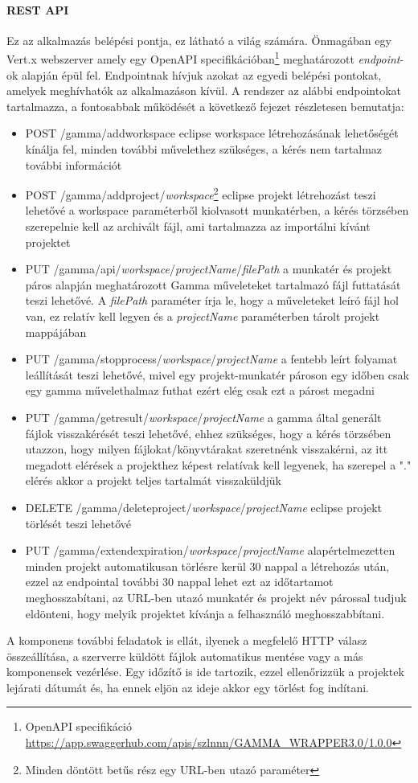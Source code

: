 \paragraph{REST API} Ez az alkalmazás belépési pontja, ez látható a világ számára. Önmagában egy Vert.x webszerver amely egy OpenAPI specifikációban\footnote{OpenAPI specifikáció \url{https://app.swaggerhub.com/apis/szlnnn/GAMMA_WRAPPER3.0/1.0.0}} meghatározott \textit{endpoint}-ok alapján épül fel. Endpointnak hívjuk azokat az egyedi belépési pontokat, amelyek meghívhatók az alkalmazáson kívül. A rendszer az alábbi endpointokat tartalmazza, a fontosabbak működését a következő fejezet részletesen bemutatja:
\begin{itemize}
	\item POST /gamma/addworkspace eclipse workspace létrehozásának lehetőségét kínálja fel, minden további művelethez szükséges, a kérés nem tartalmaz további információt
	\item POST /gamma/addproject/{\textit{workspace}}\footnote{Minden döntött betűs rész egy URL-ben utazó paraméter} eclipse projekt létrehozást teszi lehetővé a {workspace} paraméterből kiolvasott munkatérben, a kérés törzsében szerepelnie kell az archivált fájl, ami tartalmazza az importálni kívánt projektet
	\item PUT /gamma/api/{\textit{workspace}}/{\textit{projectName}}/{\textit{filePath}} a munkatér és projekt páros alapján meghatározott Gamma műveleteket tartalmazó fájl futtatását teszi lehetővé. A {\textit{filePath}} paraméter írja le, hogy a műveleteket leíró fájl hol van, ez relatív kell legyen és a {\textit{projectName}} paraméterben tárolt projekt mappájában
	\item PUT /gamma/stopprocess/{\textit{workspace}}/{\textit{projectName}} a fentebb leírt folyamat leállítását teszi lehetővé, mivel egy projekt-munkatér pároson egy időben csak egy gamma művelethalmaz futhat ezért elég csak ezt a párost megadni
	\item PUT /gamma/getresult/{\textit{workspace}}/{\textit{projectName}} a gamma által generált fájlok visszakérését teszi lehetővé, ehhez szükséges, hogy a kérés törzsében utazzon, hogy milyen fájlokat/könyvtárakat szeretnénk visszakérni, az itt megadott elérések a projekthez képest relatívak kell legyenek, ha szerepel a "." elérés akkor a projekt teljes tartalmát visszaküldjük
	\item DELETE /gamma/deleteproject/{\textit{workspace}}/{\textit{projectName}} eclipse projekt törlését teszi lehetővé
	\item PUT /gamma/extendexpiration/{\textit{workspace}}/{\textit{projectName}} alapértelmezetten minden projekt automatikusan törlésre kerül 30 nappal a létrehozás után, ezzel az endpointal további 30 nappal lehet ezt az időtartamot meghosszabítani, az URL-ben utazó munkatér és projekt név párossal tudjuk eldönteni, hogy melyik projektet kívánja a felhasználó meghosszabbítani.
\end{itemize}
A komponens további feladatok is ellát, ilyenek a megfelelő HTTP válasz összeállítása, a szerverre küldött fájlok automatikus mentése vagy a más komponensek vezérlése. Egy időzítő is ide tartozik, ezzel ellenőrizzük a projektek lejárati dátumát és, ha ennek eljön az ideje akkor egy törlést fog indítani.

